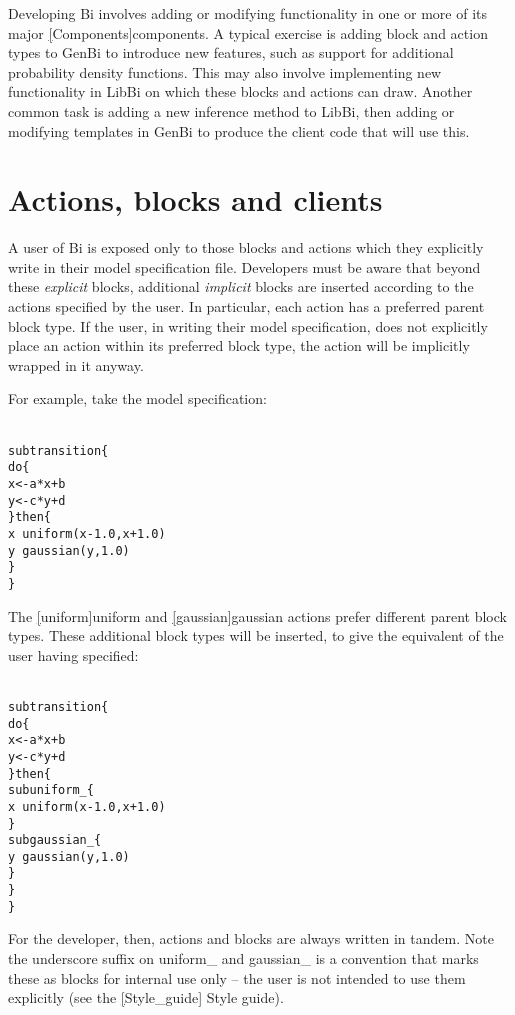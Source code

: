 
Developing Bi involves adding or modifying functionality in one or more of its
major \hyperref[hyper][Components]{components}. A typical exercise is adding
block and action types to GenBi to introduce new features, such as support for
additional probability density functions. This may also involve implementing
new functionality in LibBi on which these blocks and actions can draw. Another
common task is adding a new inference method to LibBi, then adding or
modifying templates in GenBi to produce the client code that will use this.

\section{Actions, blocks and clients}

A user of Bi is exposed only to those blocks and actions which they explicitly
write in their model specification file. Developers must be aware that beyond
these \textit{explicit} blocks, additional \textit{implicit} blocks are
inserted according to the actions specified by the user. In particular, each
action has a preferred parent block type. If the user, in writing their model
specification, does not explicitly place an action within its
preferred block type, the action will be implicitly wrapped in it anyway.

For example, take the model specification:
\begin{alltt}{\sf
    sub transition \{
      do \{
        x <- a*x + b
        y <- c*y + d
      \} then \{
        x ~ uniform(x - 1.0, x + 1.0)
        y ~ gaussian(y, 1.0)
      \}
    \}
}\end{alltt}
The \hyperref[hyper][uniform]{\sf uniform} and
\hyperref[hyper][gaussian]{\sf gaussian} actions prefer
different parent block types. These additional block types will be inserted,
to give the equivalent of the user having specified:
\begin{alltt}{\sf
    sub transition \{
      do \{
        x <- a*x + b
        y <- c*y + d
      \} then \{
        sub uniform_ \{
          x ~ uniform(x - 1.0, x + 1.0)
        \}
        sub gaussian_ \{
          y ~ gaussian(y, 1.0)
        \}
      \}  
    \}
}\end{alltt}

For the developer, then, actions and blocks are always written in tandem.
Note the underscore suffix on \textsf{uniform\_} and \textsf{gaussian\_} is a
convention that marks these as blocks for internal use only -- the user is not
intended to use them explicitly (see the \hyperref[hyper][Style_guide]{\sf
  Style guide}).

